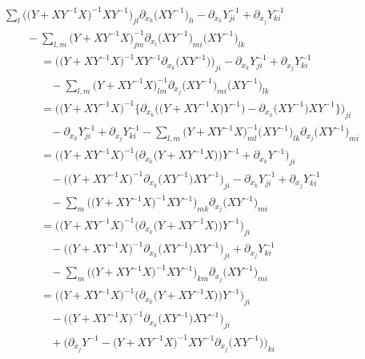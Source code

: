 \documentclass[10pt,a4paper]{amsart}
\numberwithin{equation}{section}
\begin{document}
\begin{gather*}
 \sum_l \bigl(\bigl(Y+XY^{-1}X\bigr)^{-1}XY^{-1}\bigr)_{jl}\partial_{x_k}\bigl(XY^{-1}\bigr)_{li}-\partial_{x_k}Y^{-1}_{ji}+\partial_{x_j}Y^{-1}_{ki}\\
 \qquad-\sum_{l,m}\bigl(Y+XY^{-1}X\bigr)^{-1}_{jm}\partial_{x_l}\bigl(XY^{-1}\bigr)_{mi} \bigl(XY^{-1}\bigr)_{lk} \\
\phantom{\qquad-}{}= \bigl(\bigl(Y+XY^{-1}X\bigr)^{-1}XY^{-1}\partial_{x_k}\bigl(XY^{-1}\bigr)\bigr)_{ji}-\partial_{x_k}Y^{-1}_{ji}+\partial_{x_j}Y^{-1}_{ki}\\
\phantom{\qquad-=}{} -\sum_{l,m}\bigl(Y+XY^{-1}X\bigr)^{-1}_{lm}\partial_{x_j}\bigl(XY^{-1}\bigr)_{mi} \bigl(XY^{-1}\bigr)_{lk} \\
\phantom{\qquad-}{}= \bigl(\bigl(Y+XY^{-1}X\bigr)^{-1}\big\{\partial_{x_k}\bigl(\bigl(Y+XY^{-1}X\bigr)Y^{-1}\bigr)-\partial_{x_k}\bigl(XY^{-1}\bigr)XY^{-1}\big\}\bigr)_{ji}\\
\phantom{\qquad-=}{} -\partial_{x_k}Y^{-1}_{ji}+\partial_{x_j}Y^{-1}_{ki}-\sum_{l,m}\bigl(Y+XY^{-1}X\bigr)^{-1}_{ml}\bigl(XY^{-1}\bigr)_{lk}\partial_{x_j}\bigl(XY^{-1}\bigr)_{mi} \\
\phantom{\qquad-}{}= \bigl(\bigl(Y+XY^{-1}X\bigr)^{-1}\bigl(\partial_{x_k}\bigl(Y+XY^{-1}X\bigr)\bigr)Y^{-1}+\partial_{x_k}Y^{-1}\bigr)_{ji}\\
 \phantom{\qquad-=}{} -\bigl(\bigl(Y+XY^{-1}X\bigr)^{-1}\partial_{x_k}\bigl(XY^{-1}\bigr)XY^{-1}\bigr)_{ji}-\partial_{x_k}Y^{-1}_{ji}+\partial_{x_j}Y^{-1}_{ki}\\
\phantom{\qquad-=}{} -\sum_m\bigl(\bigl(Y+XY^{-1}X\bigr)^{-1}XY^{-1}\bigr)_{mk}\partial_{x_j}\bigl(XY^{-1}\bigr)_{mi} \\
\phantom{\qquad-}{}= \bigl(\bigl(Y+XY^{-1}X\bigr)^{-1}\bigl(\partial_{x_k}\bigl(Y+XY^{-1}X\bigr)\bigr)Y^{-1}\bigr)_{ji}\\
\phantom{\qquad-=}{} -\bigl(\bigl(Y+XY^{-1}X\bigr)^{-1}\partial_{x_k}\bigl(XY^{-1}\bigr)XY^{-1}\bigr)_{ji}+\partial_{x_j}Y^{-1}_{ki}\\
\phantom{\qquad-=}{} -\sum_m\bigl(\bigl(Y+XY^{-1}X\bigr)^{-1}XY^{-1}\bigr)_{km}\partial_{x_j}\bigl(XY^{-1}\bigr)_{mi} \\
\phantom{\qquad-}{}= \bigl(\bigl(Y+XY^{-1}X\bigr)^{-1}\bigl(\partial_{x_k}\bigl(Y+XY^{-1}X\bigr)\bigr)Y^{-1}\bigr)_{ji}\\
\phantom{\qquad-=}{} -\bigl(\bigl(Y+XY^{-1}X\bigr)^{-1}\partial_{x_k}\bigl(XY^{-1}\bigr)XY^{-1}\bigr)_{ji}\\
\phantom{\qquad-=}{} +\bigl(\partial_{x_j}Y^{-1}-\bigl(Y+XY^{-1}X\bigr)^{-1}XY^{-1}\partial_{x_j}\bigl(XY^{-1}\bigr)\bigr)_{ki} \\

\end{gather*}
\end{document}
